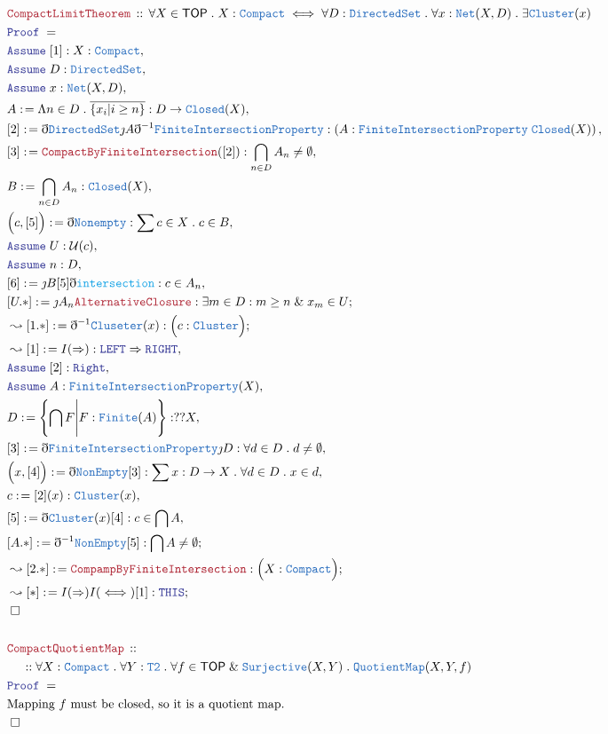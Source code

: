 \documentclass[12pt]{scrartcl}
\newcommand{\TYPE}[1]{\textcolor{NavyBlue}{\mathtt{#1}}}
\newcommand{\FUNC}[1]{\textcolor{Cerulean}{\mathtt{#1}}}
\newcommand{\LOGIC}[1]{\textcolor{Blue}{\mathtt{#1}}}
\newcommand{\THM}[1]{\textcolor{Maroon}{\mathtt{#1}}}
\renewcommand{\.}{\; . \;}
\newcommand{\de}{: \kern 0.1pc =}
\newcommand{\Theorem}[2]{& \THM{#1} \, :: \, #2 \\ & \Proof = \\ }
\newcommand{\NewLine}{\\ & \kern 1pc}
\newcommand{\Page}[1]{ \begin{align*} #1 \end{align*}   }
\newcommand{ \bd }{ \ByDef }
\newcommand{\Explain}[1]{& \text{#1.} \\}
\renewcommand{\And}{\; \& \;}
\newcommand{\Imply}{\Rightarrow}
\newcommand{\Surj}{\TYPE{Surjective}}
\newcommand{\Say}[3]{& #1 \de #2 : #3, \\}
\newcommand{\Conclude}[3]{& #1 \de #2 : #3; \\}
\newcommand{\Derive}[3]{& \leadsto #1 \de #2 : #3, \\}
\newcommand{\DeriveConclude}[3]{& \leadsto #1 \de #2 : #3 ; \\}
\newcommand{\Assume}[2]{& \LOGIC{Assume} \; #1 : #2, \\}
\newcommand{\QED}{\; \square}
\newcommand{\EndProof}{& \QED \\}
\newcommand{\ByDef}{\eth}
\newcommand{\ByConstr}{\jmath}
\newcommand{\Proof}{\LOGIC{Proof} \; }
\newcommand{\QM}{\TYPE{QuotientMap}}
\newcommand{\Compact}{\TYPE{Compact}}
\newcommand{\TOP}{\mathsf{TOP}}
\newcommand{\U}{\mathcal{U}}
\begin{document}
\Page{
	\Theorem{CompactLimitTheorem}
	{
		\forall X \in \TOP \.
		X : \TYPE{Compact} \iff
		\forall D : \TYPE{DirectedSet}	\.
		\forall x : \TYPE{Net}(X,D) \.
		\exists \TYPE{Cluster}(x)
	}
	\Assume{[1]}{X : \TYPE{Compact}}
	\Assume{D}{\TYPE{DirectedSet}}
	\Assume{x}{\TYPE{Net}(X,D)}
	\Say{A}{\Lambda n \in D \. \overline{\{ x_i | i \ge n \}}}{ D \to \TYPE{Closed}(X)  } 
	\Say{[2]}{\bd \TYPE{DirectedSet}\ByConstr A \bd^{-1} \TYPE{FiniteIntersectionProperty}}
	{
		\left( A : \TYPE{FiniteIntersectionProperty}\; \TYPE{Closed}(X)   \right) 
	}
	\Say{[3]}{\THM{CompactByFiniteIntersection}([2])}
	{
		\bigcap_{n \in D} A_n \neq \emptyset
	}
	\Say{B}{\bigcap_{n \in D} A_n}{\TYPE{Closed}(X)}
	\Say{\Big(c,[5]\Big)}{\bd \TYPE{Nonempty}}{\sum c \in X \. c \in B }
	\Assume{U}{\U(c)}
	\Assume{n}{D}
	\Say{[6]}{\ByConstr B [5] \bd \FUNC{intersection}}
	{
		c \in A_n
	}
	\Conclude{[U.*]}{\ByConstr A_n\THM{AlternativeClosure}}
	{
		\exists m \in D : m \ge n \And x_m \in U
	}
	\DeriveConclude{[1.*]}{\bd^{-1} \TYPE{Cluseter}(x)}{\Big( c : \TYPE{Cluster}\Big)}
	\Derive{[1]}{I(\Imply)}{ \LOGIC{LEFT} \Imply  \LOGIC{RIGHT} }
	\Assume{[2]}{\LOGIC{Right}}
	\Assume{A}{\TYPE{FiniteIntersectionProperty}(X)}
	\Say{D}{\left\{ \bigcap F \Bigg|  F : \TYPE{Finite}(A)  \right\}}{??X}
	\Say{[3]}{\bd \TYPE{FiniteIntersectionProperty}\ByConstr D}
	{
		\forall d \in D \. d \neq \emptyset
	}
	\Say{\Big( x, [4] \Big)}{\bd \TYPE{NonEmpty}[3]}
	{
		\sum x : D \to X \. \forall d \in D \. x \in d
	}
	\Say{c}{[2](x)}{\TYPE{Cluster}(x)}
	\Say{[5]}{\bd \TYPE{Cluster}(x)[4]}{c \in \bigcap A } 
	\Conclude{[A.*]}{\bd^{-1} \TYPE{NonEmpty}[5]}{\bigcap A \neq \emptyset}
	\DeriveConclude{[2.*]}{\THM{CompampByFiniteIntersection}}{\Big( X : \TYPE{Compact}  \Big)}
	\DeriveConclude{[*]}{I(\Imply)I(\iff)[1]}{\LOGIC{THIS}}
	\EndProof
	\\
	\Theorem{CompactQuotientMap}
	{
		\NewLine ::		
		\forall X : \Compact \.
		\forall Y : \TYPE{T2} \.
		\forall f \in \TOP \And \Surj(X,Y) \.
		\QM(X,Y,f)
	}
	\Explain{Mapping  $f$ must be closed, so it is a quotient map}
	\EndProof
}
\newpage
\end{document}
